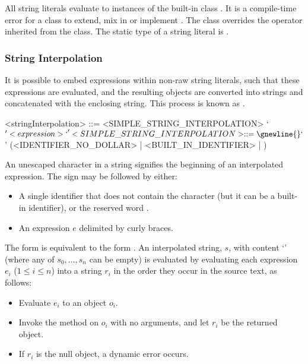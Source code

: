 \documentclass[makeidx]{article}
\begin{document}
{\LMHash{}%
All string literals evaluate to instances of the built-in class .
It is a compile-time error for a class to
extend, mix in or implement .
The  class overrides the \lit{==} operator inherited from
the  class.
The static type of a string literal is .


\subsubsection{String Interpolation}

\LMHash{}%
It is possible to embed expressions within non-raw string literals,
such that these expressions are evaluated,
and the resulting objects are converted into strings and
concatenated with the enclosing string.
This process is known as .

\begin{grammar}
<stringInterpolation> ::= <SIMPLE\_STRING\_INTERPOLATION>
  \alt `${' <expression> `}'

<SIMPLE\_STRING\_INTERPOLATION> ::= \gnewline{}
  `$' (<IDENTIFIER\_NO\_DOLLAR> | <BUILT\_IN\_IDENTIFIER> | \THIS)
\end{grammar}


\LMHash{}%
An unescaped \lit{\$} character in a string signifies
the beginning of an interpolated expression.
The \lit{\$} sign may be followed by either:

\begin{itemize}
\item A single identifier \id{} that does not contain the \lit{\$} character
  (but it can be a built-in identifier),
  or the reserved word \THIS.
\item An expression $e$ delimited by curly braces.
\end{itemize}

\LMHash{}%
The form \code{\$\id} is equivalent to the form \code{\$\{\id\}}.
An interpolated string, $s$, with content
`'
(where any of $s_0, \ldots, s_n$ can be empty)
is evaluated by evaluating each expression $e_i$ ($1 \le i \le n$)
into a string $r_i$ in the order they occur in the source text, as follows:

\begin{itemize}
\item Evaluate $e_i$ to an object $o_i$.
\item Invoke the  method on $o_i$ with no arguments,
  and let $r_i$ be the returned object.
\item If $r_i$ is the null object, a dynamic error occurs.
\end{itemize}

}
\end{document}
